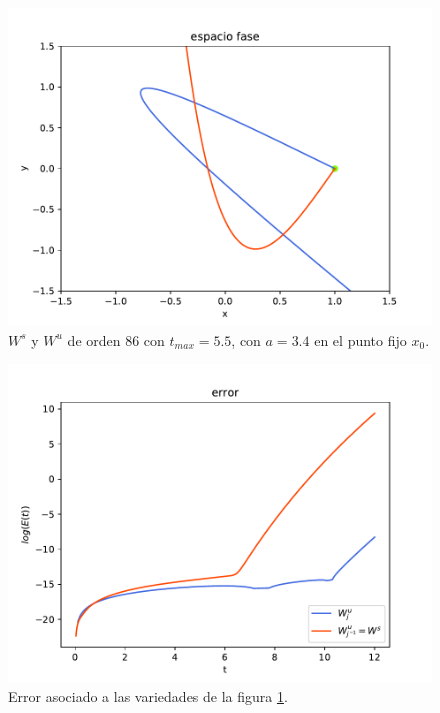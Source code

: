 \begin{figure}[H]
\centering
\includegraphics[scale=0.6]{jung34}
\caption{$W^{s}$ y $W^{u}$ de orden 86 con $t_{max}=5.5$, con $a=3.4$ en el punto fijo $x_{0}$.}
\label{jung1}
\end{figure}


\begin{figure}[H]
\centering
\includegraphics[scale=0.6]{error_jung34}
\caption{Error asociado a las variedades de la figura \ref{jung1}.}
\label{errorjung1}
\end{figure}




